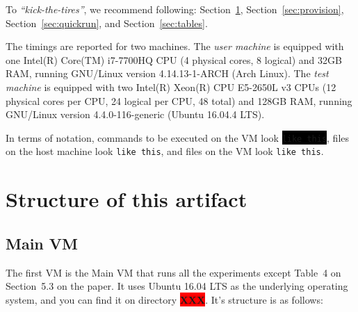 \documentclass[12pt]{article}
\newcommand{\command}[1]{\colorbox{black}{\texttt{\color{white}#1}}}
\newcommand{\host}[1]{\colorbox{blue!20}{\texttt{\color{black}#1}}}
\newcommand{\vm}[1]{\colorbox{green!20}{\texttt{\color{black}#1}}}
\newcommand{\XXX}{\colorbox{red}{\bf\color{white}XXX}}
\begin{document}
To \emph{``kick-the-tires''}, we recommend following:
Section~\ref{sec:structure}, Section~\ref{sec:provision},
Section~\ref{sec:quickrun}, and Section~\ref{sec:tables}.

The timings are reported for two machines.  The \emph{user machine} is equipped
with one Intel(R) Core(TM) i7-7700HQ CPU (4 physical cores, 8 logical) and 32GB
RAM, running GNU/Linux version 4.14.13-1-ARCH (Arch Linux).  The \emph{test
machine} is equipped with two Intel(R) Xeon(R) CPU E5-2650L v3 CPUs (12 physical
cores per CPU, 24 logical per CPU, 48 total) and 128GB RAM, running GNU/Linux
version 4.4.0-116-generic (Ubuntu 16.04.4 LTS).

In terms of notation, commands to be executed on the VM look \command{like
this}, files on the host machine look \host{like this}, and files on the VM look
\vm{like this}.

\section{Structure of this artifact}
\label{sec:structure}

\subsection{Main VM}
\label{sec:main}

The first VM is the Main VM that runs all the experiments except Table~4 on
Section~5.3 on the paper.  It uses Ubuntu 16.04 LTS as the underlying operating
system, and you can find it on directory \XXX.  It's structure is as follows:
\end{document}
